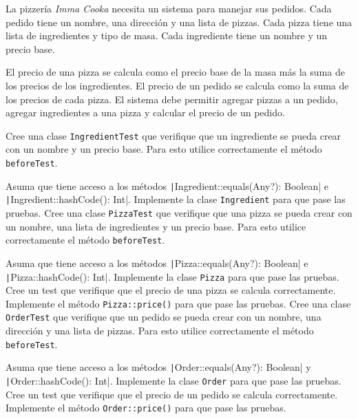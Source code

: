   \begin{Exercise}[title={La Pizzería}]
    La pizzería \textit{Imma Cooka} necesita un sistema para manejar sus pedidos.
    Cada pedido tiene un nombre, una dirección y una lista de pizzas.
    Cada pizza tiene una lista de ingredientes y tipo de masa.
    Cada ingrediente tiene un nombre y un precio base.
    
    El precio de una pizza se calcula como el precio base de la masa más la suma de los precios de
    los ingredientes.
    El precio de un pedido se calcula como la suma de los precios de cada pizza.
    El sistema debe permitir agregar pizzas a un pedido, agregar ingredientes a una pizza y
    calcular el precio de un pedido.

    \Question Cree una clase \texttt{IngredientTest} que verifique que un ingrediente se pueda crear 
      con un nombre y un precio base.
      Para esto utilice correctamente el método \texttt{beforeTest}.

      Asuma que tiene acceso a los métodos 
      \texttt|Ingredient::equals(Any?): Boolean| e 
      \texttt|Ingredient::hashCode(): Int|.
    \Question Implemente la clase \texttt{Ingredient} para que pase las pruebas.
    \Question Cree una clase \texttt{PizzaTest} que verifique que una pizza se pueda crear con un 
      nombre, una lista de ingredientes y un precio base.
      Para esto utilice correctamente el método \texttt{beforeTest}.

      Asuma que tiene acceso a los métodos 
      \texttt|Pizza::equals(Any?): Boolean| e 
      \texttt|Pizza::hashCode(): Int|.
    \Question Implemente la clase \texttt{Pizza} para que pase las pruebas.
    \Question Cree un test que verifique que el precio de una pizza se calcula correctamente.
    \Question Implemente el método \texttt{Pizza::price()} para que pase las pruebas.
    \Question Cree una clase \texttt{OrderTest} que verifique que un pedido se pueda crear con un 
      nombre, una dirección y una lista de pizzas.
      Para esto utilice correctamente el método \texttt{beforeTest}.

      Asuma que tiene acceso a los métodos 
      \texttt|Order::equals(Any?): Boolean| y
      \texttt|Order::hashCode(): Int|.
    \Question Implemente la clase \texttt{Order} para que pase las pruebas.
    \Question Cree un test que verifique que el precio de un pedido se calcula correctamente.
    \Question Implemente el método \texttt{Order::price()} para que pase las pruebas.


\end{Exercise}
